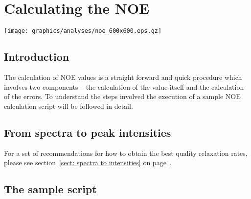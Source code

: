 
\chapter{Calculating the NOE} \label{ch: NOE}


\begin{figure*}[h]
\texttt{[image: graphics/analyses/noe\_600x600.eps.gz]}
\end{figure*}



\section{Introduction}

The calculation of NOE values is a straight forward and quick procedure which involves two components -- the calculation of the value itself and the calculation of the errors.  To understand the steps involved the execution of a sample NOE calculation script will be followed in detail.




\section{From spectra to peak intensities}

For a set of recommendations for how to obtain the best quality relaxation rates, please see section~\ref{sect: spectra to intensities} on page~\pageref{sect: spectra to intensities}.




\section{The sample script}

